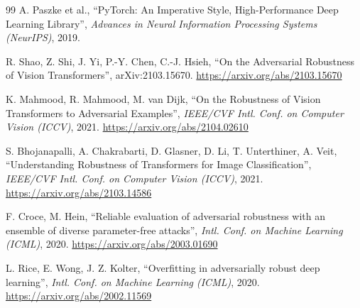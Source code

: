 \documentclass[twoside,a4paper,11pt]{article}
\begin{document}
\begin{thebibliography}{99}
A. Paszke et al., ``PyTorch: An Imperative Style, High-Performance Deep
Learning Library'', {\em Advances in Neural Information Processing Systems
(NeurIPS)}, 2019.

R. Shao, Z. Shi, J. Yi, P.-Y. Chen, C.-J. Hsieh, ``On the Adversarial
Robustness of Vision Transformers'', arXiv:2103.15670.
\url{https://arxiv.org/abs/2103.15670}

K. Mahmood, R. Mahmood, M. van Dijk, ``On the Robustness of Vision
Transformers to Adversarial Examples'', {\em IEEE/CVF Intl. Conf. on
Computer Vision (ICCV)}, 2021. \url{https://arxiv.org/abs/2104.02610}

S. Bhojanapalli, A. Chakrabarti, D. Glasner, D. Li, T. Unterthiner,
A. Veit, ``Understanding Robustness of Transformers for Image
Classification'', {\em IEEE/CVF Intl. Conf. on Computer Vision (ICCV)},
2021. \url{https://arxiv.org/abs/2103.14586}

F. Croce, M. Hein, ``Reliable evaluation of adversarial robustness with
an ensemble of diverse parameter-free attacks'', {\em Intl. Conf. on
Machine Learning (ICML)}, 2020. \url{https://arxiv.org/abs/2003.01690}

L. Rice, E. Wong, J. Z. Kolter, ``Overfitting in adversarially robust
deep learning'', {\em Intl. Conf. on Machine Learning (ICML)}, 2020.
\url{https://arxiv.org/abs/2002.11569}

\end{thebibliography}
\end{document}
